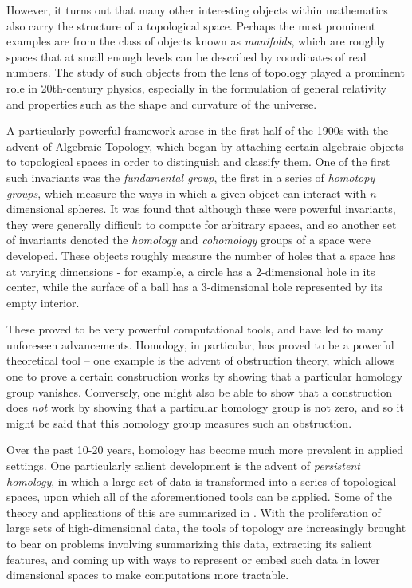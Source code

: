 \documentclass[normal]{aomart}
\newtheorem[{}\it]{thm}{Theorem}[section]
\theoremstyle{definition}
\newtheorem*[{}\it]{notation}{Notation}
\begin{document}
However, it turns out that many other interesting objects within mathematics also carry the structure of a topological space. Perhaps the most prominent examples are from the class of objects known as \textit{manifolds}, which are roughly spaces that at small enough levels can be described by coordinates of real numbers. The study of such objects from the lens of topology played a prominent role in 20th-century physics, especially in the formulation of general relativity and properties such as the shape and curvature of the universe.

A particularly powerful framework arose in the first half of the 1900s with the advent of Algebraic Topology, which began by attaching certain algebraic objects to topological spaces in order to distinguish and classify them. One of the first such invariants was the \textit{fundamental group}, the first in a series of \textit{homotopy groups}, which measure the ways in which a given object can interact with $n$-dimensional spheres. It was found that although these were powerful invariants, they were generally difficult to compute for arbitrary spaces, and so another set of invariants denoted the \textit{homology} and \textit{cohomology} groups of a space were developed. These objects roughly measure the number of holes that a space has at varying dimensions - for example, a circle has a 2-dimensional hole in its center, while the surface of a ball has a 3-dimensional hole represented by its empty interior.

These proved to be very powerful computational tools, and have led to many unforeseen advancements. Homology, in particular, has proved to be a powerful theoretical tool -- one example is the advent of obstruction theory, which allows one to prove a certain construction works by showing that a particular homology group vanishes. Conversely, one might also be able to show that a construction does \textit{not} work by showing that a particular homology group is not zero, and so it might be said that this homology group measures such an obstruction.

Over the past 10-20 years, homology has become much more prevalent in applied settings. One particularly salient development is the advent of \textit{persistent homology}, in which a large set of data is transformed into a series of topological spaces, upon which all of the aforementioned tools can be applied. Some of the theory and applications of this are summarized in \cite{Basu}. With the proliferation of large sets of high-dimensional data, the tools of topology are increasingly brought to bear on problems involving summarizing this data, extracting its salient features, and coming up with ways to represent or embed such data in lower dimensional spaces to make computations more tractable.
\end{document}
